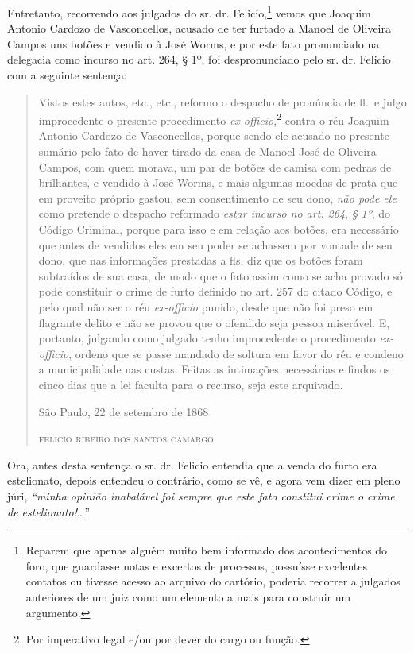 Entretanto, recorrendo aos julgados do sr. dr. Felicio,\footnote{
  Reparem que apenas alguém muito bem informado dos acontecimentos do
  foro, que guardasse notas e excertos de processos, possuísse
  excelentes contatos ou tivesse acesso ao arquivo do cartório, poderia
  recorrer a julgados anteriores de um juiz como um elemento a mais para
  construir um argumento.} vemos que Joaquim Antonio Cardozo de
Vasconcellos, acusado de ter furtado a Manoel de Oliveira Campos uns
botões e vendido à José Worms, e por este fato pronunciado na delegacia
como incurso no art. 264, § 1º, foi despronunciado pelo sr. dr. Felicio
com a seguinte sentença:

\begin{quote}
Vistos estes autos, etc., etc., reformo o despacho de pronúncia de
fl.~e julgo improcedente o presente procedimento
\emph{ex-officio},\footnote{ Por imperativo legal e/ou por dever do
  cargo ou função.} contra o réu Joaquim Antonio Cardozo de
Vasconcellos, porque sendo ele acusado no presente sumário pelo fato de
haver tirado da casa de Manoel José de Oliveira Campos, com quem morava,
um par de botões de camisa com pedras de brilhantes, e vendido à José
Worms, e mais algumas moedas de prata que em proveito próprio gastou,
sem consentimento de seu dono, \emph{não pode ele} como pretende o
despacho reformado \emph{estar incurso no art. 264}, \emph{§ 1º}, do
Código Criminal, porque para isso e em relação aos botões, era
necessário que antes de vendidos eles em seu poder se achassem por
vontade de seu dono, que nas informações prestadas a fls. diz que os
botões foram subtraídos de sua casa, de modo que o fato assim como se
acha provado só pode constituir o crime de furto definido no art. 257 do
citado Código, e pelo qual não ser o réu \emph{ex-officio} punido, desde
que não foi preso em flagrante delito e não se provou que o ofendido
seja pessoa miserável. E, portanto, julgando como julgado tenho
improcedente o procedimento \emph{ex-officio}, ordeno que se passe
mandado de soltura em favor do réu e condeno a municipalidade nas
custas. Feitas as intimações necessárias e findos os cinco dias que a
lei faculta para o recurso, seja este arquivado.

\begin{flushright}
São Paulo, 22 de setembro de 1868

\textsc{felicio ribeiro dos santos camargo}
\end{flushright}
\end{quote}

Ora, antes desta sentença o sr. dr. Felicio entendia que a venda do
furto era estelionato, depois entendeu o contrário, como se vê, e agora
vem dizer em pleno júri, \emph{``minha opinião inabalável foi sempre que
este fato constitui crime o crime de estelionato!}\ldots{}''

